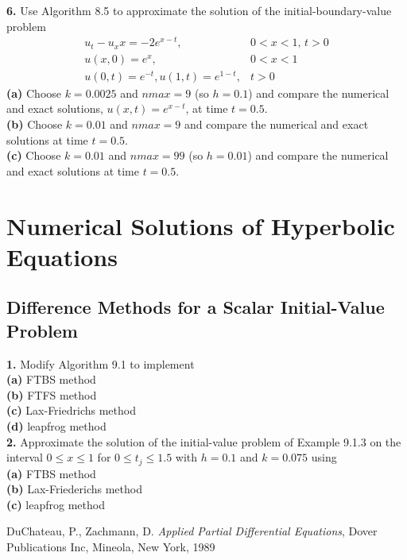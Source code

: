 \documentclass{amsbook}%
\theoremstyle{plain}
\numberwithin{equation}{section}
\begin{document}
		\noindent\textbf{6.} Use Algorithm 8.5 to approximate the solution of the initial-boundary-value problem 
		\begin{align}
			u_t-u_xx=-2e^{x-t}, & 0<x<1,\, t>0\\
			u(x,0)=e^x, & 0<x<1\\
			u(0,t)=e^{-t}, u(1,t)=e^{1-t}, & t>0
		\end{align}
		\textbf{(a)} Choose $k=0.0025$ and $nmax=9$ (so $h=0.1$) and compare the numerical and exact solutions, $u(x,t)=e^{x-t}$, at time $t=0.5$.\\
		\textbf{(b)} Choose $k=0.01$ and $nmax=9$ and compare the numerical and exact solutions at time $t=0.5$.\\
		\textbf{(c)} Choose $k=0.01$ and $nmax=99$ (so $h=0.01$) and compare the numerical and exact solutions at time $t=0.5$.
		\\[12pt]
		
\chapter{Numerical Solutions of Hyperbolic Equations}

\section{Difference Methods for a Scalar Initial-Value Problem}

	\noindent\textbf{1.} Modify Algorithm 9.1 to implement\\
	\textbf{(a)} FTBS method\\
	\textbf{(b)} FTFS method\\
	\textbf{(c)} Lax-Friedrichs method\\
	\textbf{(d)} leapfrog method\\[12pt]
	
	\noindent\textbf{2.} Approximate the solution of the initial-value problem of Example 9.1.3 on the interval $0\leq x\leq 1$ for $0\leq t_j\leq 1.5$ with $h=0.1$ and $k=0.075$ using\\
	\textbf{(a)} FTBS method\\
	\textbf{(b)} Lax-Friederichs method\\
	\textbf{(c)} leapfrog method\\[12pt]

\backmatter

\begin{thebibliography}{9}
DuChateau, P., Zachmann, D. \textit{Applied Partial Differential Equations}, Dover Publications Inc,
Mineola, New York, 1989

\end{thebibliography}
\end{document}
